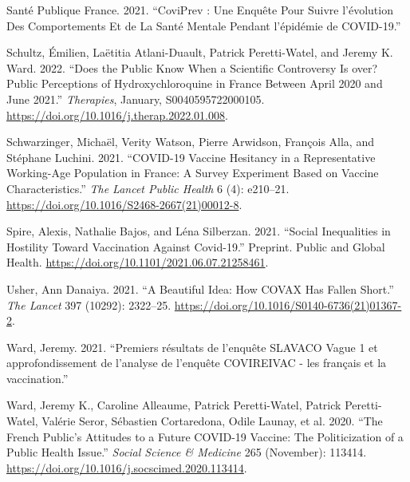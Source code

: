 \documentclass[
]{article}
\newlength{\cslhangindent}
\newlength{\cslentryspacingunit} %
\newenvironment{CSLReferences}[2] %
 {%
  \setlength{\parindent}{0pt}
  \ifodd #1
  \let\oldpar\par
  \def\par{\hangindent=\cslhangindent\oldpar}
  \fi
  \setlength{\parskip}{#2\cslentryspacingunit}
 }%
 {}
\begin{document}
\begin{CSLReferences}{1}{0}
\leavevmode{}%
Santé Publique France. 2021. {``{CoviPrev} : Une Enquête Pour Suivre l'évolution Des Comportements Et de La Santé Mentale Pendant l'épidémie de {COVID-19}.''}

\leavevmode{}%
Schultz, Émilien, Laëtitia Atlani-Duault, Patrick Peretti-Watel, and Jeremy K. Ward. 2022. {``Does the Public Know When a Scientific Controversy Is over? {Public} Perceptions of Hydroxychloroquine in {France} Between {April} 2020 and {June} 2021.''} \emph{Therapies}, January, S0040595722000105. \url{https://doi.org/10.1016/j.therap.2022.01.008}.

\leavevmode{}%
Schwarzinger, Michaël, Verity Watson, Pierre Arwidson, François Alla, and Stéphane Luchini. 2021. {``{COVID-19} Vaccine Hesitancy in a Representative Working-Age Population in {France}: A Survey Experiment Based on Vaccine Characteristics.''} \emph{The Lancet Public Health} 6 (4): e210--21. \url{https://doi.org/10.1016/S2468-2667(21)00012-8}.

\leavevmode{}%
Spire, Alexis, Nathalie Bajos, and Léna Silberzan. 2021. {``Social Inequalities in Hostility Toward Vaccination Against {Covid-19}.''} Preprint. {Public and Global Health}. \url{https://doi.org/10.1101/2021.06.07.21258461}.

\leavevmode{}%
Usher, Ann Danaiya. 2021. {``A Beautiful Idea: How {COVAX} Has Fallen Short.''} \emph{The Lancet} 397 (10292): 2322--25. \url{https://doi.org/10.1016/S0140-6736(21)01367-2}.

\leavevmode{}%
Ward, Jeremy. 2021. {``{Premiers résultats de l'enquête SLAVACO Vague 1 et approfondissement de l'analyse de l'enquête COVIREIVAC - les français et la vaccination}.''}

\leavevmode{}%
Ward, Jeremy K., Caroline Alleaume, Patrick Peretti-Watel, Patrick Peretti-Watel, Valérie Seror, Sébastien Cortaredona, Odile Launay, et al. 2020. {``The {French} Public's Attitudes to a Future {COVID-19} Vaccine: {The} Politicization of a Public Health Issue.''} \emph{Social Science \& Medicine} 265 (November): 113414. \url{https://doi.org/10.1016/j.socscimed.2020.113414}.


\end{CSLReferences}
\end{document}
